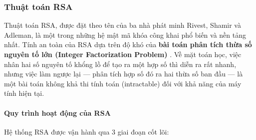\subsubsection*{Thuật toán RSA}

Thuật toán RSA, được đặt theo tên của ba nhà phát minh Rivest, Shamir và Adleman, là một trong những hệ mật mã khóa công khai phổ biến và nền tảng nhất. Tính an toàn của RSA dựa trên độ khó của \textbf{bài toán phân tích thừa số nguyên tố lớn (Integer Factorization Problem)} \cite{Rivest1978}. Về mặt toán học, việc nhân hai số nguyên tố khổng lồ để tạo ra một hợp số thì diễn ra rất nhanh, nhưng việc làm ngược lại — phân tích hợp số đó ra hai thừa số ban đầu — là một bài toán không khả thi tính toán (intractable) đối với khả năng của máy tính hiện tại.

\paragraph*{Quy trình hoạt động của RSA}
Hệ thống RSA được vận hành qua 3 giai đoạn cốt lõi:


